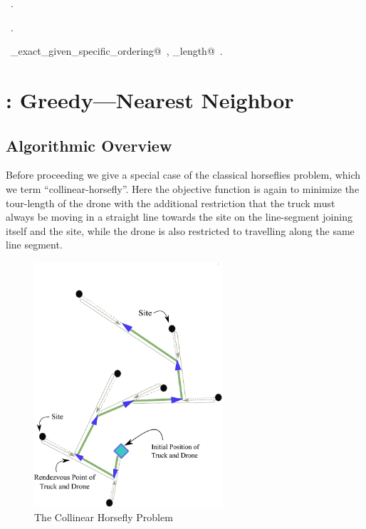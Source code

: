 \documentclass[11.5pt]{report}
\begin{document}
\begin{flushleft}
\begin{minipage}{\linewidth}
\footnotesize
\begin{list}{}{\setlength{\itemsep}{-\parsep}\setlength{\itemindent}{-\leftmargin}}
\item \NWtxtMacroDefBy\ .
\item \NWtxtMacroRefIn\ .
\item \NWtxtIdentsUsed\nobreak\  \verb@algo_exact_given_specific_ordering@\nobreak\ , \verb@tour_length@\nobreak\ .
\item{}
\end{list}
\end{minipage}\vspace{4ex}
\end{flushleft}
\section{: Greedy---Nearest Neighbor}  
\label{sec:greedy-nn}
\subsection{Algorithmic Overview}
\hspace{1cm} Before proceeding we give a special case of the classical horseflies 
problem, which we term ``collinear-horsefly''. Here the objective function
is again to minimize the tour-length of the drone with the additional restriction 
that the truck must always be moving in a straight line towards the site on the 
line-segment joining itself and the site, while the drone is also restricted to 
travelling along the same line segment. 

\begin{figure}[H]
\centering
    \includegraphics[width=7cm]{../webs/docs/collinear_horseflies.eps}
    \caption{The Collinear Horsefly Problem}
    \label{fig:collinear-horseflies}
\end{figure}
\end{document}
